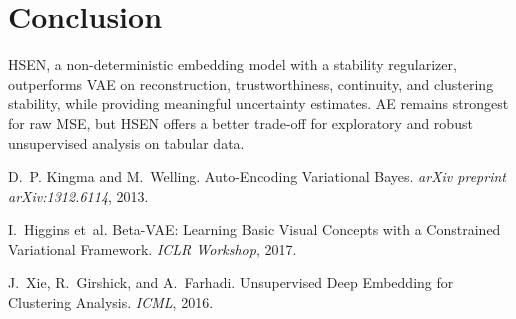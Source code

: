 \documentclass[12pt,a4paper]{article}
\begin{document}
\section{Conclusion}
HSEN, a non-deterministic embedding model with a stability regularizer, outperforms VAE on reconstruction, trustworthiness, continuity, and clustering stability, while providing meaningful uncertainty estimates. AE remains strongest for raw MSE, but HSEN offers a better trade-off for exploratory and robust unsupervised analysis on tabular data.

\begin{thebibliography}{9}

D.~P. Kingma and M.~Welling.
\newblock Auto-Encoding Variational Bayes.
\newblock \emph{arXiv preprint arXiv:1312.6114}, 2013.

I.~Higgins et~al.
\newblock Beta-VAE: Learning Basic Visual Concepts with a Constrained Variational Framework.
\newblock \emph{ICLR Workshop}, 2017.

J.~Xie, R.~Girshick, and A.~Farhadi.
\newblock Unsupervised Deep Embedding for Clustering Analysis.
\newblock \emph{ICML}, 2016.

\end{thebibliography}
\end{document}
